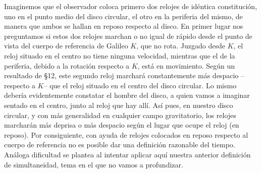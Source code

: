 \documentclass[spanish]{book}
\begin{document}
Imaginemos que el observador coloca primero dos relojes de idéntica constitución,
uno en el punto medio del disco circular, el otro en la periferia del mismo, de manera
que ambos se hallan en reposo respecto al disco. En primer lugar nos preguntamos si
estos dos relojes marchan o no igual de rápido desde el punto de vista del cuerpo de
referencia de Galileo $K$, que no rota. Juzgado desde $K$, el reloj situado en el centro
no tiene ninguna velocidad, mientras que el de la periferia, debido a la rotación
respecto a $K$, está en movimiento. Según un resultado de \S 12, este segundo reloj
marchará constantemente más despacio --respecto a $K$-- que el reloj situado en el
centro del disco circular. Lo mismo debería evidentemente constatar el hombre del
disco, a quien vamos a imaginar sentado en el centro, junto al reloj que hay allí. Así
pues, en nuestro disco circular, y con más generalidad en cualquier campo
gravitatorio, los relojes marcharán más deprisa o más despacio según el lugar que
ocupe el reloj (en reposo). Por consiguiente, con ayuda de relojes colocados en reposo
respecto al cuerpo de referencia no es posible dar una definición razonable del tiempo.
Análoga dificultad se plantea al intentar aplicar aquí nuestra anterior definición de
simultaneidad, tema en el que no vamos a profundizar.
\end{document}
